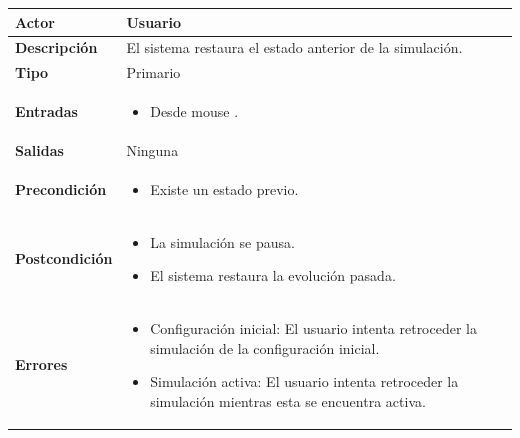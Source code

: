 \begin{table}[H]
	\begin{center}
		\begin{tabular}{| p{} | p{} |}
			\hline 
			\textbf{Actor} & Usuario \\ \hline
			\textbf{Descripción} & El sistema restaura el estado anterior de la simulación. \\ \hline
			\textbf{Tipo} & Primario \\ \hline
			\textbf{Entradas} &
			\begin{itemize}[noitemsep, nosep]
				\item Desde mouse \BTN{paso_atras}.
			\end{itemize}
			\\ \hline
			\textbf{Salidas} & Ninguna \\ \hline
			\textbf{Precondición} & \begin{itemize}[noitemsep, nosep]
				\item Existe un estado previo.
			\end{itemize}
			\\ \hline
			\textbf{Postcondición} & \begin{itemize}[noitemsep, nosep]
				\item La simulación se pausa.
				\item El sistema restaura la evolución pasada.
			\end{itemize}  \\ \hline
			\textbf{Errores} & 
			\begin{itemize}[noitemsep, nosep]
				\item Configuración inicial: El usuario intenta retroceder la simulación de la configuración inicial.
				\item Simulación activa: El usuario intenta retroceder la simulación mientras esta se encuentra activa.
			\end{itemize}\\ \hline
		\end{tabular}
	\end{center}
\end{table}

